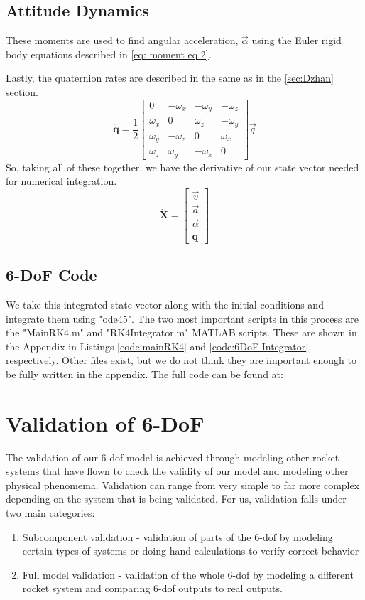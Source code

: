 \documentclass[12pt]{report}
\begin{document}
\subsection{Attitude Dynamics}
These moments are used to find angular acceleration, $\vec{\alpha}$ using the Euler rigid body equations described in \eqref{eq: moment eq 2}. 

Lastly, the quaternion rates are described in the same as in the \ref{sec:Dzhan} section.
\begin{equation}
    \dot{\textbf{q}}=\frac{1}{2}\begin{bmatrix}
        0&-\omega_x&-\omega_y&-\omega_z\\
        \omega_x&0&\omega_z&-\omega_y\\
        \omega_y&-\omega_z&0&\omega_x\\
        \omega_z&\omega_y&-\omega_x&0
    \end{bmatrix}\vec{q}
\end{equation}
So, taking all of these together, we have the derivative of our \gls{state vector} needed for numerical integration.
\begin{equation}
    \dot{\textbf{X}}=\begin{bmatrix}
        \vec{v}\\\vec{a}\\\vec{\alpha}\\\dot{\textbf{q}}
    \end{bmatrix}
\end{equation}
\subsection{6-DoF Code}
We take this integrated state vector along with the initial conditions and integrate them using "ode45". The two most important scripts in this process are the "MainRK4.m" and "RK4Integrator.m" MATLAB scripts. These are shown in the Appendix in Listings \ref{code:mainRK4} and  \ref{code:6DoF Integrator}, respectively. Other files exist, but we do not think they are important enough to be fully written in the appendix. The full code can be found at: %
\section{Validation of 6-DoF}
The validation of our 6-\gls{dof} model is achieved through modeling other rocket systems that have flown to check the validity of our model and modeling other physical phenomema. Validation can range from very simple to far more complex depending on the system that is being validated. For us, validation falls under two main categories:
\begin{enumerate}
    \item Subcomponent validation - validation of parts of the 6-\gls{dof} by modeling certain types of systems or doing hand calculations to verify correct behavior
    \item Full model validation - validation of the whole 6-\gls{dof} by modeling a different rocket system and comparing 6-\gls{dof} outputs to real outputs.
\end{enumerate}
\end{document}
